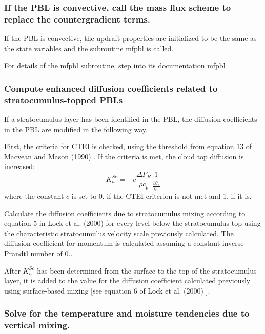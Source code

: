 \subsubsection*{If the P\+BL is convective, call the mass flux scheme to replace the countergradient terms.}

If the P\+BL is convective, the updraft properties are initialized to be the same as the state variables and the subroutine mfpbl is called.

For details of the mfpbl subroutine, step into its documentation \hyperlink{mfpbl_8f_a5787e718b62c0502c0734303a16cd8ed}{mfpbl}

\subsubsection*{Compute enhanced diffusion coefficients related to stratocumulus-\/topped P\+B\+Ls}

If a stratocumulus layer has been identified in the P\+BL, the diffusion coefficients in the P\+BL are modified in the following way.


\begin{DoxyEnumerate}
\item First, the criteria for C\+T\+EI is checked, using the threshold from equation 13 of Macvean and Mason (1990) \cite{macvean_and_mason_1990}. If the criteria is met, the cloud top diffusion is increased\+: \[ K_h^{Sc} = -c\frac{\Delta F_R}{\rho c_p}\frac{1}{\frac{\partial \theta_v}{\partial z}} \] where the constant $c$ is set to 0. if the C\+T\+EI criterion is not met and 1. if it is.
\item Calculate the diffusion coefficients due to stratocumulus mixing according to equation 5 in Lock et al. (2000) \cite{lock_et_al_2000} for every level below the stratocumulus top using the characteristic stratocumulus velocity scale previously calculated. The diffusion coefficient for momentum is calculated assuming a constant inverse Prandtl number of 0..
\end{DoxyEnumerate}

After $K_h^{Sc}$ has been determined from the surface to the top of the stratocumulus layer, it is added to the value for the diffusion coefficient calculated previously using surface-\/based mixing \mbox{[}see equation 6 of Lock et al. (2000) \cite{lock_et_al_2000} \mbox{]}.

\subsubsection*{Solve for the temperature and moisture tendencies due to vertical mixing.}

